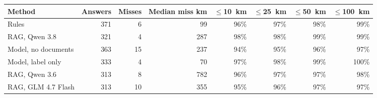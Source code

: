 \begin{tabular}{lrrrrrrr}
\toprule
Method & Answers & Misses & Median miss km & $\le$10~km & $\le$25~km & $\le$50~km & $\le$100~km \\
\midrule
Rules & 371 & 6 & 99 & 96\% & 97\% & 98\% & 99\% \\
RAG, Qwen 3.8 & 321 & 4 & 287 & 98\% & 98\% & 99\% & 99\% \\
Model, no documents & 363 & 15 & 237 & 94\% & 95\% & 96\% & 97\% \\
Model, label only & 333 & 4 & 70 & 97\% & 98\% & 99\% & 100\% \\
RAG, Qwen 3.6 & 313 & 8 & 782 & 96\% & 97\% & 97\% & 98\% \\
RAG, GLM 4.7 Flash & 313 & 10 & 355 & 95\% & 96\% & 97\% & 97\% \\
\bottomrule
\end{tabular}
